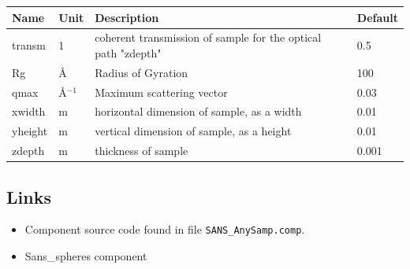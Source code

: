 \begin{longtable}{p{}p{}p{}p{}}
\toprule
\textbf{Name} & \textbf{Unit} & \textbf{Description} & \textbf{Default} \\
\midrule
\endhead
transm & 1 & coherent transmission of sample for the optical path "zdepth" & 0.5 \\
Rg & \AA{} & Radius of Gyration & 100 \\
qmax & \AA{}$^{-1}$ & Maximum scattering vector & 0.03 \\
xwidth & m & horizontal dimension of sample, as a width & 0.01 \\
yheight & m & vertical dimension of sample, as a height & 0.01 \\
zdepth & m & thickness of sample & 0.001 \\
\bottomrule
\end{longtable}

\subsection*{Links}
\begin{itemize}
  \item Component source code found in file \texttt{SANS\_AnySamp.comp}.
  \item Sans\_spheres component
\end{itemize}

